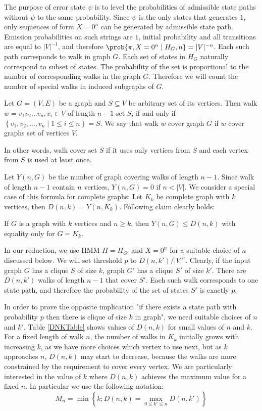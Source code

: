 The purpose of error state $\psi$ is to level the probabilities of admissible
state paths without $\psi$ to the same probability. Since $\psi$ is the only
states that generates $1$, only sequences of form $X=0^n$ can be generated by
admissible state path. Emission probabilities on such strings are $1$, initial
probability and all transitions are equal to $|V|^{-1}$, and therefore
$\prob{\pi, X=0^n\mid H_G,n} = |V|^{-n}$.  Each such path corresponds to walk in
graph $G$. Each set of states in $H_G$ naturally correspond to subset of states.
The probability of the set is proportional to the number of corresponding walks
in the graph $G$. Therefore we will count the number of special walks in induced
subgraphs of $G$.

\begin{definition}
Let $G=(V, E)$ be a graph and $S\subseteq V$ be arbitrary set of its vertices.
Then walk $w=v_1v_2\dots v_n, v_i\in V$ of length $n-1$  set
$S$, if and only if $\left\{v_1, v_2, \dots, v_n\mid 1\leq i\leq n\right\}=S$. 
We say that walk $w$ cover graph $G$ if $w$ cover graphs set of vertices $V$.

In other words, walk cover set $S$ if it uses only vertices from $S$ and each
vertex from $S$ is used at least once.
\end{definition}

Let $Y(n, G)$ be the number of graph covering walks of length $n-1$. Since walk
of length $n - 1$ contain $n$ vertices, $Y(n, G)=0$ if $n<|V|$. We consider a
special case of this formula for complete graphs: Let $K_k$ be
complete graph with $k$ vertices, then $D(n, k) = Y(n, K_k)$. Following claim
clearly holds:

\begin{lemma}\label{NotCliqueIsSmaller}
If $G$ is a graph with $k$ vertices and $n\ge k$, then
$Y(n,G)\le D(n,k)$ with equality only for $G=K_k$. 
\end{lemma}

In our reduction, we use HMM $H=H_{G'}$ and $X=0^n$ for a suitable choice of $n$
discussed below. We will set threshold $p$ to $D(n,k')/|V|^{n}$. Clearly, if the
input graph $G$ has a clique $S$ of size $k$, graph $G'$ has a clique $S'$ of
size $k'$. There are $D(n,k')$ walks of length $n-1$ that cover $S'$. Each such
walk corresponds to one state path, and therefore the probability of the set of
states $S'$ is exactly $p$. 

In order to prove the opposite implication "if there exists a state path with
probability $p$ then there is clique of size $k$ in graph", we need suitable choices
of $n$ and $k'$. Table \ref{DNKTable} shows values of $D(n,k)$ for
small values of $n$ and $k$. For a fixed length of walk $n$, the
number of walks in $K_k$ initially grows with increasing $k$, as we
have more choices which vertex to use next, but as $k$ approaches $n$,
$D(n,k)$  may start to decrease, because the walks are more constrained by
the requirement to cover every vertex. We are particularly interested in
the value of $k$ where $D(n,k)$ achieves the maximum value for a fixed $n$. 
In particular we use the following notation:
$$M_{n} = \min\left\{k ; D(n,k) = \max_{0\leq k'\leq
  n}D(n,k')\right\}$$
  
